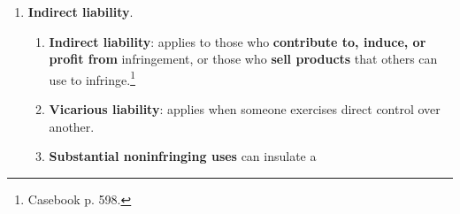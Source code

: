 \begin{enumerate}
\begin{enumerate}
\begin{enumerate}
\begin{enumerate}
                structural parts of the allegedly infringing program.
            \end{enumerate}
        \end{enumerate}
        \item \textbf{Derivative works}: owner has the exclusive right. \S\ 
        106(2). Stock scenes and characters are not copyrightable, but 
        specific characters are. \emph{Anderson v. Stallone}.
        \item \textbf{Distribution}: owner has exclusive right---but the right 
        extends only to the \textbf{first sale}. \emph{Kirtsaeng v. Wiley}.
        \item \textbf{Public performance and display}:
        \begin{enumerate}
            \item 1972: no public performance rights for \emph{analog} sound 
            recordings. But there are performance rights for \emph{digital} 
            sound recordings (1995).
            \item \textbf{Public interest exemption} (\S\ 110): generally 
            applies to educational, free, or charitable performances and 
            displays.\footnote{Casebook p. 592.} Fairness in Music Licensing 
            Act (1998) broadened exemptions for homes, small business, 
            restaurants, and certain larger establishments.
            \item \textbf{Compulsory licenses}---five areas: cable, satellite, 
            jukeboxes, public broadcasting, webcasting.\footnote{Casebook p.  
            593--92.}
            \item \textbf{Moral rights}: applies only to visual works.  
            Resulted from Berne, 1990.
        \end{enumerate}
    \end{enumerate}
    \item \textbf{Indirect liability}.
    \begin{enumerate}
        \item \textbf{Indirect liability}: applies to those who 
        \textbf{contribute to, induce, or profit from} infringement, or those 
        who \textbf{sell products} that others can use to 
        infringe.\footnote{Casebook p. 598.}
        \item \textbf{Vicarious liability}: applies when someone exercises 
        direct control over another.
        \item \textbf{Substantial noninfringing uses} can insulate a 

\end{enumerate}
\end{enumerate}
